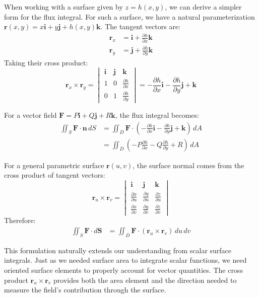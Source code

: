 \noindent When working with a surface given by $z = h(x,y)$, we can derive a simpler form for the flux integral. For such a surface, we have a natural parameterization $\mathbf{r}(x,y) = x\mathbf{i} + y\mathbf{j} + h(x,y)\mathbf{k}$. The tangent vectors are:
\begin{align*}
\mathbf{r}_x &= \mathbf{i} + \frac{\partial h}{\partial x}\mathbf{k} \\
\mathbf{r}_y &= \mathbf{j} + \frac{\partial h}{\partial y}\mathbf{k}
\end{align*}
Taking their cross product:
\[
\mathbf{r}_x \times \mathbf{r}_y = \begin{vmatrix}
\mathbf{i} & \mathbf{j} & \mathbf{k} \\
1 & 0 & \frac{\partial h}{\partial x} \\
0 & 1 & \frac{\partial h}{\partial y}
\end{vmatrix} = -\frac{\partial h}{\partial x}\mathbf{i} - \frac{\partial h}{\partial y}\mathbf{j} + \mathbf{k}
\]

\noindent For a vector field $\mathbf{F} = P\mathbf{i} + Q\mathbf{j} + R\mathbf{k}$, the flux integral becomes: 
\begin{align*}
\iint_S \mathbf{F} \cdot \mathbf{n}\,dS &= \iint_D \mathbf{F} \cdot \left(-\frac{\partial h}{\partial x}\mathbf{i} - \frac{\partial h}{\partial y}\mathbf{j} + \mathbf{k}\right)\,dA \\
&= \iint_D \left(-P\frac{\partial h}{\partial x} - Q\frac{\partial h}{\partial y} + R\right)\,dA
\end{align*}

\noindent For a general parametric surface $\mathbf{r}(u,v)$, the surface normal comes from the cross product of tangent vectors:
\[
\mathbf{r}_u \times \mathbf{r}_v = \begin{vmatrix}
\mathbf{i} & \mathbf{j} & \mathbf{k} \\
\frac{\partial x}{\partial u} & \frac{\partial y}{\partial u} & \frac{\partial z}{\partial u} \\
\frac{\partial x}{\partial v} & \frac{\partial y}{\partial v} & \frac{\partial z}{\partial v}
\end{vmatrix}
\]
Therefore:
\begin{align*}
\iint_S \mathbf{F} \cdot d\mathbf{S} &= \iint_D \mathbf{F} \cdot (\mathbf{r}_u \times \mathbf{r}_v)\,du\,dv
\end{align*}

\noindent This formulation naturally extends our understanding from scalar surface integrals. Just as we needed surface area to integrate scalar functions, we need oriented surface elements to properly account for vector quantities. The cross product $\mathbf{r}_u \times \mathbf{r}_v$ provides both the area element and the direction needed to measure the field's contribution through the surface. 

